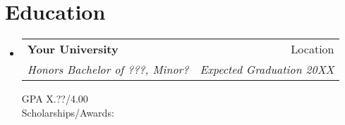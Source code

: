 \documentclass[letterpaper,11pt]{article}
\makeatletter
\newcommand{\resumeSubheading}[4]{
  \vspace{-1pt}\item[]
  \begin{tabular*}{0.98\textwidth}{l@{\extracolsep{\fill}}r}
      \hspace{-10pt}\textbf{#1} & #2 \\
      \hspace{-10pt}\textit{\small#3} & \textit{\small #4} \\
    \end{tabular*}\vspace{-5pt}
}
\newcommand{\resumeSubHeadingListStart}{\begin{itemize}[leftmargin=*]}
\newcommand{\resumeSubHeadingListEnd}{\end{itemize}}
\newcommand{\shorterSection}[1]{\vspace{-10pt}\section{#1}}
\makeatother
\begin{document}
\shorterSection{Education}
  \resumeSubHeadingListStart
    \resumeSubheading
      {Your University}{Location}
      {Honors Bachelor of ???, Minor?}{Expected Graduation 20XX}{

      \hspace{-12pt} GPA X.??/4.00 \\
      \hspace{-12pt} Scholarships/Awards:}

  \resumeSubHeadingListEnd
\end{document}
